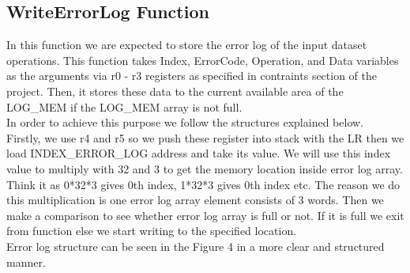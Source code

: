 \documentclass[pdftex,12pt,a4paper]{article}
\begin{document}
\subsection{WriteErrorLog Function}
In this function we are expected to store the error log of the input dataset operations. This function takes Index, ErrorCode, Operation, and Data variables as the arguments via r0 - r3 registers as specified in contraints section of the project. Then, it stores these data to the current available area of the LOG\_MEM if the LOG\_MEM array is not full. \\

In order to achieve this purpose we follow the structures explained below. \\

Firstly, we use r4 and r5 so we push these register into stack with the LR then we load INDEX\_ERROR\_LOG address and take its value. We will use this index value to multiply with 32 and 3 to get the memory location inside error log array. Think it as 0*32*3 gives 0th index, 1*32*3 gives 0th index etc. The reason we do this multiplication is one error log array element consists of 3 words. Then we make a comparison to see whether error log array is full or not. If it is full we exit from function else we start writing to the specified location.\\ 

Error log structure can be seen in the Figure 4 in a more clear and structured manner.
\end{document}
